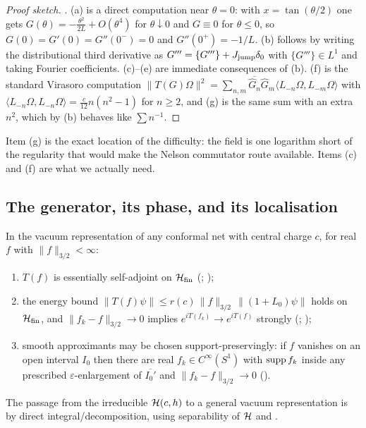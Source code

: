 \begin{proof}[Proof sketch]
\cite[Thm.~2.3]{RigorC}.  (a) is a direct computation near $\theta=0$: with $x=\tan(\theta/2)$ one gets
$G(\theta)=-\frac{\theta^{2}}{2L}+O(\theta^{4})$ for $\theta\downarrow0$ and $G\equiv0$ for $\theta\le0$, so
$G(0)=G'(0)=G''(0^{-})=0$ and $G''(0^{+})=-1/L$.  (b) follows by writing the distributional third
derivative as $G'''=\{G'''\}+J_{\rm jump}\delta_{0}$ with $\{G'''\}\in L^{1}$ and taking Fourier
coefficients.  (c)--(e) are immediate consequences of (b).  (f) is the standard Virasoro computation
$\|T(G)\Omega\|^{2}=\sum_{n,m}\overline{\hat G_{n}}\hat G_{m}\langle L_{-n}\Omega,L_{-m}\Omega\rangle$ with
$\langle L_{-n}\Omega,L_{-n}\Omega\rangle=\frac{c}{12}n(n^{2}-1)$ for $n\ge2$, and (g) is the same sum with
an extra $n^{2}$, which by (b) behaves like $\sum n^{-1}$.
\end{proof}

Item (g) is the exact location of the difficulty: the field is one logarithm short of the regularity that
would make the Nelson commutator route available.  Items (c) and (f) are what we actually need.

\subsection{The generator, its phase, and its localisation}

\begin{lemma}\label{lem:CW}
In the vacuum representation of any conformal net with central charge $c$, for real $f$ with
$\|f\|_{3/2}<\infty$:
\begin{enumerate}[label=\textup{(\roman*)},leftmargin=2.4em]
\item $T(f)$ is essentially self-adjoint on $\mathcal H_{\rm fin}$ \textup{(}\cite[Thm.~4.4]{CW};
 \cite[Prop.~2.2(3)]{CDIT}\textup{)};
\item the energy bound $\|T(f)\psi\|\le r(c)\,\|f\|_{3/2}\,\|(1+L_{0})\psi\|$ holds on $\mathcal H_{\rm fin}$, and
 $\|f_{k}-f\|_{3/2}\to0$ implies $e^{iT(f_{k})}\to e^{iT(f)}$ strongly
 \textup{(}\cite[Prop.~4.5]{CW}; \cite[Prop.~2.2(4),(5)]{CDIT}\textup{)};
\item smooth approximants may be chosen support-preservingly: if $f$ vanishes on an open interval $I_{0}$
 then there are real $f_{k}\in C^{\infty}(S^{1})$ with $\operatorname{supp} f_{k}$ inside any prescribed
 $\varepsilon$-enlargement of $\overline{I_{0}'}$ and $\|f_{k}-f\|_{3/2}\to0$ \textup{(}\cite[Lemma
 4.6]{CW}\textup{)}.
\end{enumerate}
The passage from the irreducible $\mathcal H(c,h)$ to a general vacuum representation is by direct
integral/decomposition, using separability of $\mathcal H$ and \cite[Prop.~3.14]{CDIT}.
\end{lemma}

